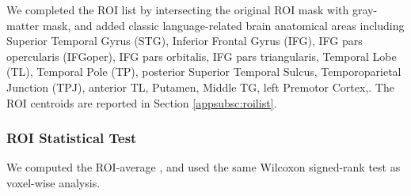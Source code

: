 We completed the ROI list by intersecting the original ROI mask with gray-matter mask, and added classic language-related brain anatomical areas including Superior Temporal Gyrus (STG), Inferior Frontal Gyrus (IFG), IFG pars opercularis (IFGoper), IFG pars orbitalis, IFG pars triangularis, Temporal Lobe (TL), Temporal Pole (TP), posterior Superior Temporal Sulcus, Temporoparietal Junction (TPJ), anterior TL, Putamen, Middle TG, left Premotor Cortex,\parencite{pallierCorticalRepresentationConstituent2011}. The ROI centroids are reported in Section \ref{appsubsc:roilist}.

\subsubsection{ROI Statistical Test}
We computed the ROI-average , and used the same Wilcoxon signed-rank test as voxel-wise analysis.